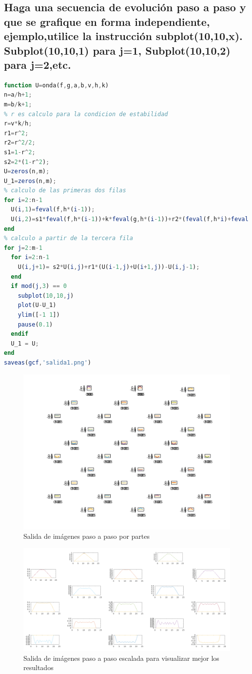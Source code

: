 \documentclass{article}
\begin{document}
\subsection{Haga una secuencia de evolución paso a paso y que se grafique en forma independiente, ejemplo,utilice la instrucción subplot(10,10,x). Subplot(10,10,1) para j=1, Subplot(10,10,2) para j=2,etc.}
\begin{lstlisting}[language=Octave, caption=Version modificada del código para obtener el paso a paso de la gráfica,label=lst:lst_mods]
function U=onda(f,g,a,b,v,h,k)
n=a/h+1;
m=b/k+1;
% r es calculo para la condicion de estabilidad
r=v*k/h;
r1=r^2;
r2=r^2/2;
s1=1-r^2;
s2=2*(1-r^2);
U=zeros(n,m);
U_1=zeros(n,m);
% calculo de las primeras dos filas
for i=2:n-1
  U(i,1)=feval(f,h*(i-1));
  U(i,2)=s1*feval(f,h*(i-1))+k*feval(g,h*(i-1))+r2*(feval(f,h*i)+feval(f,h*(i-2)));
end
% calculo a partir de la tercera fila
for j=2:m-1
  for i=2:n-1
    U(i,j+1)= s2*U(i,j)+r1*(U(i-1,j)+U(i+1,j))-U(i,j-1);
  end
  if mod(j,3) == 0 
    subplot(10,10,j)
    plot(U-U_1)
    ylim([-1 1])
    pause(0.1)
  endif
  U_1 = U;
end
saveas(gcf,'salida1.png')
\end{lstlisting}
\begin{figure}[H]
    \centering
    \includegraphics[width=\linewidth]{salida.png}
    \caption{Salida de imágenes paso a paso por partes}
    \label{fig:img_all}
\end{figure}
\begin{figure}[H]
    \centering
    \includegraphics[width=\linewidth]{salida2.png}
    \caption{Salida de imágenes paso a paso escalada para visualizar mejor los resultados}
    \label{fig:img_all}
\end{figure}
\end{document}
